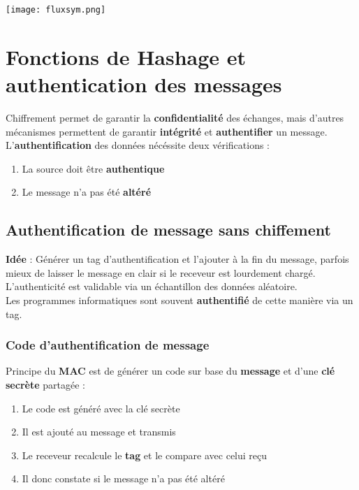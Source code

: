 \documentclass{report}
\begin{document}
			\texttt{[image: fluxsym.png]}

	\section{Fonctions de Hashage et authentication des messages}

		Chiffrement permet de garantir la \textbf{confidentialité} des échanges, mais d'autres mécanismes permettent de garantir \textbf{intégrité} et \textbf{authentifier} un message.\\

		L'\textbf{authentification} des données nécéssite deux vérifications : \\

		\begin{enumerate}
			\item La source doit être \textbf{authentique}
			\item Le message n'a pas été \textbf{altéré}\\
		\end{enumerate}

		\subsection{Authentification de message sans chiffement}

			\textbf{Idée} : Générer un tag d'authentification et l'ajouter à la fin du message, parfois mieux de laisser le message en clair si le receveur est lourdement chargé.\\
			L'authenticité est validable via un échantillon des données aléatoire.\\

			Les programmes informatiques sont souvent \textbf{authentifié} de cette manière via un tag.\\

			\subsubsection{Code d'authentification de message}

				Principe du \textbf{MAC} est de générer un code sur base du \textbf{message} et d'une \textbf{clé secrète} partagée : \\

				\begin{enumerate}
					\item Le code est généré avec la clé secrète
					\item Il est ajouté au message et transmis
					\item Le receveur recalcule le \textbf{tag} et le compare avec celui reçu
					\item Il donc constate si le message n'a pas été altéré\\
				\end{enumerate}
\end{document}
